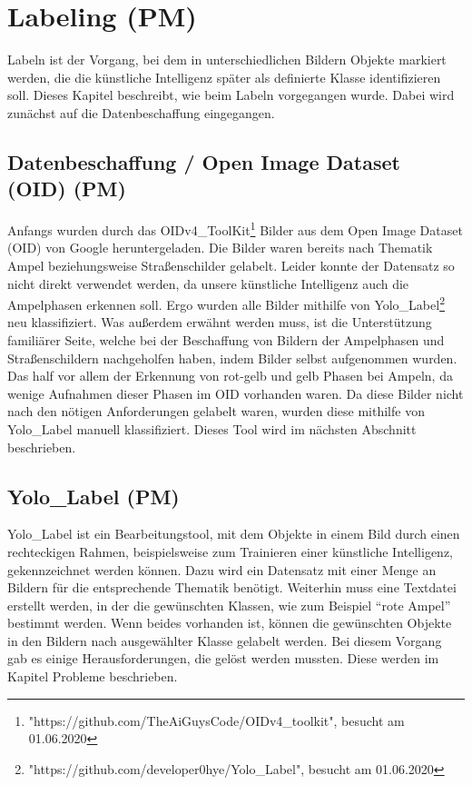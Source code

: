 \documentclass[a4paper,oneside,12pt]{report}
\begin{document}
	\chapter{Labeling (PM)}
	\begin{onehalfspace}
		 Labeln ist der Vorgang, bei dem in unterschiedlichen Bildern Objekte markiert werden, die die künstliche Intelligenz später als definierte Klasse identifizieren soll. Dieses Kapitel beschreibt, wie beim Labeln vorgegangen wurde. Dabei wird zunächst auf die Datenbeschaffung eingegangen.
		\section{Datenbeschaffung / Open Image Dataset (OID) (PM)}
		Anfangs wurden durch das OIDv4\_ToolKit\footnote{"https://github.com/TheAiGuysCode/OIDv4\_toolkit", besucht am 01.06.2020} 
		Bilder aus dem Open Image Dataset (OID) von Google heruntergeladen. Die Bilder waren bereits nach Thematik Ampel beziehungsweise Straßenschilder gelabelt. Leider konnte der Datensatz so nicht direkt verwendet werden, da unsere künstliche Intelligenz auch die Ampelphasen erkennen soll. Ergo wurden alle Bilder mithilfe von Yolo\_Label\footnote{"https://github.com/developer0hye/Yolo\_Label", besucht am 01.06.2020} 
		neu klassifiziert. Was außerdem erwähnt werden muss, ist die Unterstützung familiärer Seite, welche bei der Beschaffung von Bildern der Ampelphasen und Straßenschildern nachgeholfen haben, indem Bilder selbst aufgenommen wurden. Das half vor allem der Erkennung von rot-gelb und gelb Phasen bei Ampeln, da wenige Aufnahmen dieser Phasen im OID vorhanden waren. Da diese Bilder nicht nach den nötigen Anforderungen gelabelt waren, wurden diese mithilfe von Yolo\_Label manuell klassifiziert. Dieses Tool wird im nächsten Abschnitt beschrieben.
		\section{Yolo\_Label (PM)}
		Yolo\_Label ist ein Bearbeitungstool, mit dem Objekte in einem Bild durch einen rechteckigen Rahmen, beispielsweise zum Trainieren einer künstliche Intelligenz, gekennzeichnet werden können. Dazu wird ein Datensatz mit einer Menge an Bildern für die entsprechende Thematik benötigt. Weiterhin muss eine Textdatei erstellt werden, in der die gewünschten Klassen, wie zum Beispiel "`rote Ampel"' bestimmt werden. Wenn beides vorhanden ist, können die gewünschten Objekte in den Bildern nach ausgewählter Klasse gelabelt werden. Bei diesem Vorgang gab es einige Herausforderungen, die gelöst werden mussten. Diese werden im Kapitel Probleme beschrieben.

\end{onehalfspace}
\end{document}
